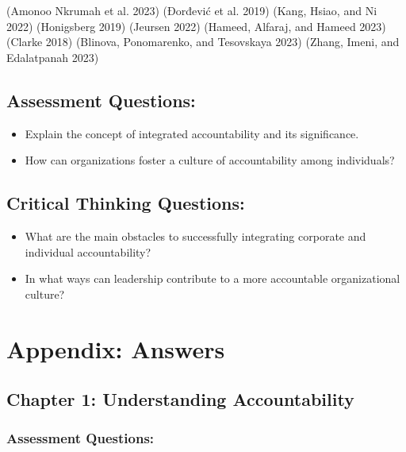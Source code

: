 \documentclass[
  letterpaper,
  DIV=11,
  numbers=noendperiod]{scrreprt}
\begin{document}
(Amonoo Nkrumah et al. 2023) (Đorđević et al. 2019) (Kang, Hsiao, and Ni
2022) (Honigsberg 2019) (Jeursen 2022) (Hameed, Alfaraj, and Hameed
2023) (Clarke 2018) (Blinova, Ponomarenko, and Tesovskaya 2023) (Zhang,
Imeni, and Edalatpanah 2023)

\subsection{Assessment Questions:}\label{assessment-questions-7}

\begin{itemize}
\item
  Explain the concept of integrated accountability and its significance.
\item
  How can organizations foster a culture of accountability among
  individuals?
\end{itemize}

\subsection{Critical Thinking
Questions:}\label{critical-thinking-questions-5}

\begin{itemize}
\item
  What are the main obstacles to successfully integrating corporate and
  individual accountability?
\item
  In what ways can leadership contribute to a more accountable
  organizational culture?
\end{itemize}

\section{Appendix: Answers}\label{appendix-answers}

\subsection{Chapter 1: Understanding
Accountability}\label{chapter-1-understanding-accountability}

\subsubsection{Assessment Questions:}\label{assessment-questions-8}
\end{document}
